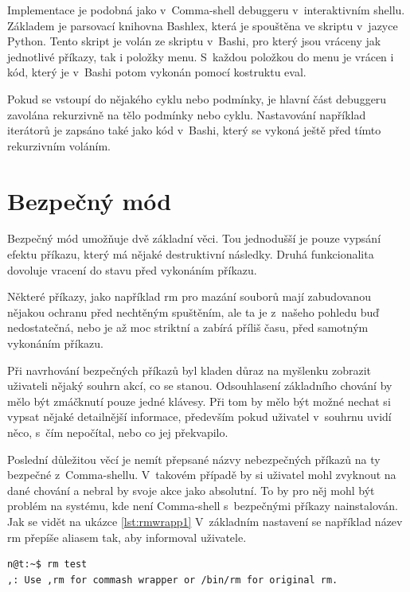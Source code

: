 \documentclass[thesis=M,czech]{FITthesis}[2012/06/26]
\begin{document}
Implementace je podobná jako v~Comma-shell debuggeru v~interaktivním shellu. Základem je parsovací knihovna Bashlex, která je spouštěna ve skriptu v~jazyce Python. Tento skript je volán ze skriptu v~Bashi, pro který jsou vráceny jak jednotlivé příkazy, tak i položky menu. S~každou položkou do menu je vrácen i kód, který je v~Bashi potom vykonán pomocí kostruktu eval.

Pokud se vstoupí do nějakého cyklu nebo podmínky, je hlavní část debuggeru zavolána rekurzivně na tělo podmínky nebo cyklu. Nastavování například iterátorů je zapsáno také jako kód v~Bashi, který se vykoná ještě před tímto rekurzivním voláním.


%
%
%
%
%
\section{Bezpečný mód}

Bezpečný mód umožňuje dvě základní věci. Tou jednodušší je pouze vypsání efektu příkazu, který má nějaké destruktivní následky. Druhá funkcionalita dovoluje vracení do stavu před vykonáním příkazu.

Některé příkazy, jako například rm pro mazání souborů mají zabudovanou nějakou ochranu před nechtěným spuštěním, ale ta je z~našeho pohledu buď nedostatečná, nebo je až moc striktní a zabírá příliš času, před samotným vykonáním příkazu.

Při navrhování bezpečných příkazů byl kladen důraz na myšlenku zobrazit uživateli nějaký souhrn akcí, co se stanou. Odsouhlasení základního chování by mělo být zmáčknutí pouze jedné klávesy. Při tom by mělo být možné nechat si vypsat nějaké detailnější informace, především pokud uživatel v~souhrnu uvidí něco, s~čím nepočítal, nebo co jej překvapilo.

Poslední důležitou věcí je nemít přepsané názvy nebezpečných příkazů na ty bezpečné z~Comma-shellu. V~takovém případě by si uživatel mohl zvyknout na dané chování a nebral by svoje akce jako absolutní. To by pro něj mohl být problém na systému, kde není Comma-shell s~bezpečnými příkazy nainstalován. Jak se vidět na ukázce \ref{lst:rmwrapp1} V~základním nastavení se například název rm přepíše aliasem tak, aby informoval uživatele.

\noindent
\begin{minipage}{\linewidth}
\begin{lstlisting}[language=bash, caption={Přepsání nebezpečných příkazů}, label={lst:rmwrapp1}]
n@t:~$ rm test
,: Use ,rm for commash wrapper or /bin/rm for original rm.
\end{lstlisting}
\end{minipage}
\end{document}
